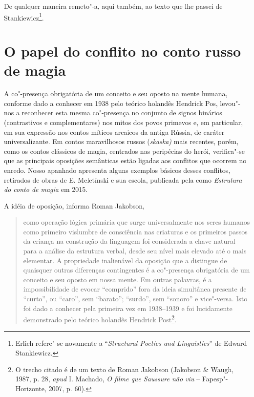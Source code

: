 {De qualquer maneira remeto"-a, aqui também, ao texto que lhe passei de
Stankiewicz\footnote{Erlich refere"-se novamente a ``\emph{Structural
  Poetics and Linguistics}'' de Edward Stankiewicz.}.

\chapter{O papel do conflito no conto russo de magia}


A co"-presença obrigatória de um conceito e seu oposto na mente humana,
conforme dado a conhecer em 1938 pelo teórico holandês Hendrick Pos,
levou"-nos a reconhecer esta mesma co"-presença no conjunto de signos
binários (contrastivos e complementares) nos mitos dos povos primevos e, em particular, em sua expressão nos contos míticos arcaicos da antiga
Rússia, de caráter universalizante. Em contos maravilhosos russos
(\emph{skaska)} mais recentes, porém, como os contos clássicos de
magia, centrados nas peripécias do herói, verifica"-se que as principais
oposições semânticas estão ligadas aos conflitos que ocorrem no enredo.
Nosso apanhado apresenta alguns exemplos básicos desses conflitos,
retirados de obras de E. Meletínski e sua escola, publicada pela 
como \emph{Estrutura do conto de magia} em 2015.

A idéia de oposição, informa Roman Jakobson,

\begin{quote}
como operação lógica primária que surge
universalmente nos seres humanos como primeiro vislumbre de consciência
nas criaturas e os primeiros passos da criança na construção da
linguagem foi considerada a chave natural para a análise da estrutura
verbal, desde seu nível mais elevado até o mais elementar. A propriedade
inalienável da oposição que a distingue de quaisquer outras diferenças
contingentes é a co"-presença obrigatória de um conceito e seu oposto em
nossa mente. Em outras palavras, é a impossibilidade de evocar ``comprido'' fora da ideia simultânea presente de ``curto'', ou ``caro'',
sem ``barato''; ``surdo'', sem ``sonoro'' e vice"-versa. Isto foi dado
a conhecer pela primeira vez em 1938--1939 e foi lucidamente demonstrado
pelo teórico holandês Hendrick Post\footnote{O trecho citado é de um texto de Roman Jakobson (Jakobson \& Waugh, 1987, p.
  28, \emph{apud} I. Machado, \emph{O filme que Saussure não viu} -- Fapesp"-Horizonte, 2007, p. 60).}.
\end{quote}



}
